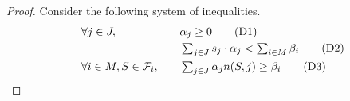 \begin{proof}
Consider the following system of inequalities.
%
%
%
\begin{alignat}{4}
	& \quad \forall j \in J,   &&\quad  \textstyle \alpha_j  \geq 0 \label{feq:d3} \tag{D1} \\
	& \quad  &&\quad  \textstyle \sum_{j\in J}  s_j\cdot \alpha_j  < \sum_{i\in M}\beta_i \label{feq:d1} \tag{D2}\\
	& \quad \forall i\in M, S\in{\cal F}_i, && \quad \textstyle \sum_{j\in J} \alpha_j n(S,j)  \geq \beta_i  \label{feq:d2}  \tag{D3}
\end{alignat}

\end{proof}
